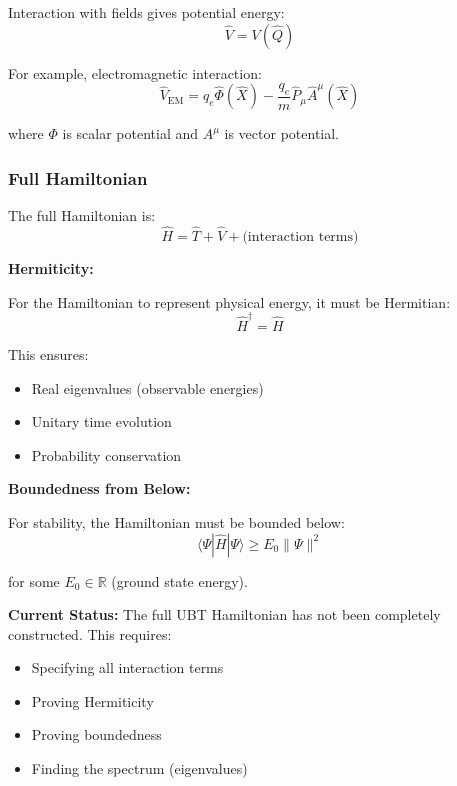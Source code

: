 Interaction with fields gives potential energy:
\begin{equation}
\hat{V} = V(\hat{Q})
\end{equation}

For example, electromagnetic interaction:
\begin{equation}
\hat{V}_{\text{EM}} = q_e \hat{\Phi}(\hat{X}) - \frac{q_e}{m} \hat{P}_{\mu} \hat{A}^{\mu}(\hat{X})
\end{equation}

where $\Phi$ is scalar potential and $A^{\mu}$ is vector potential.

\subsubsection{Full Hamiltonian}

The full Hamiltonian is:
\begin{equation}
\hat{H} = \hat{T} + \hat{V} + \text{(interaction terms)}
\end{equation}

\textbf{Hermiticity:}

For the Hamiltonian to represent physical energy, it must be Hermitian:
\begin{equation}
\hat{H}^{\dagger} = \hat{H}
\end{equation}

This ensures:
\begin{itemize}
\item Real eigenvalues (observable energies)
\item Unitary time evolution
\item Probability conservation
\end{itemize}

\textbf{Boundedness from Below:}

For stability, the Hamiltonian must be bounded below:
\begin{equation}
\langle \Psi | \hat{H} | \Psi \rangle \geq E_0 \|\Psi\|^2
\end{equation}

for some $E_0 \in \mathbb{R}$ (ground state energy).

\textbf{Current Status:} The full UBT Hamiltonian has not been completely constructed. This requires:
\begin{itemize}
\item Specifying all interaction terms
\item Proving Hermiticity
\item Proving boundedness
\item Finding the spectrum (eigenvalues)
\end{itemize}

